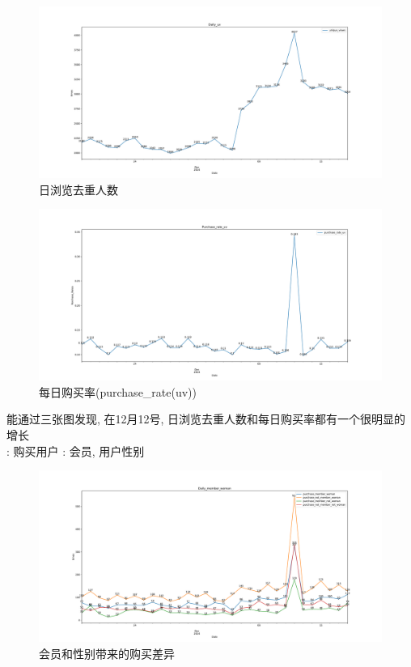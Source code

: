 \documentclass[a4paper]{article}
\begin{document}
\begin{figure}[H]
	\centering
	\includegraphics[width=1\textwidth]{./daily_uv.pdf}
	\caption{日浏览去重人数}
\end{figure}

\begin{figure}[H]
	\centering
	\includegraphics[width=1\textwidth]{./purchase_rate_uv.pdf}
	\caption{每日购买率(purchase\_rate(uv))}
\end{figure}

能通过三张图发现, 在12月12号, 日浏览去重人数和每日购买率都有一个很明显的增长\\

{}: 购买用户 : 会员, 用户性别

\begin{figure}[H]
	\centering
	\includegraphics[width=1\textwidth]{./daily_member_woman.pdf}
	\caption{会员和性别带来的购买差异}
\end{figure}
\end{document}

